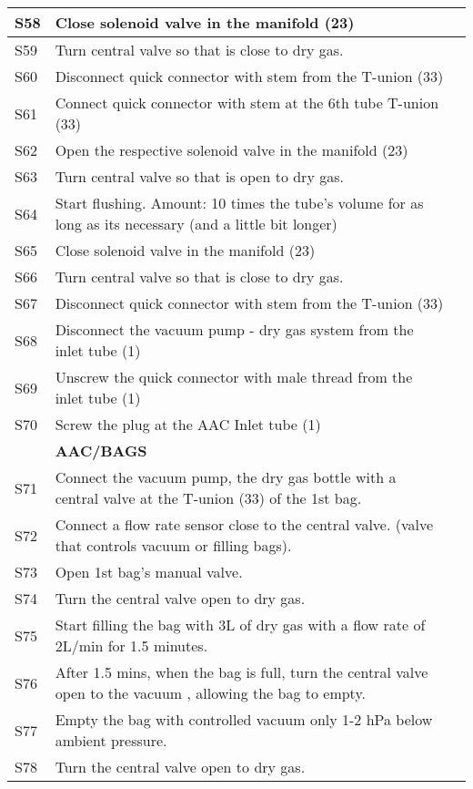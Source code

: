 \begin{longtable} {|m{}|m{}|m{}|}
S58 & Close solenoid valve in the manifold (23) & \\ \hline
S59 & Turn central valve so that is close to dry gas. & \\ \hline
S60 & Disconnect quick connector with stem from the T-union (33) & \\ \hline
S61 & Connect quick connector with stem at the 6th tube T-union (33) & \\ \hline
S62 & Open the respective solenoid valve in the manifold (23) & \\ \hline
S63 & Turn central valve so that is open to dry gas. & \\ \hline
S64 & Start flushing. Amount: 10 times the tube's volume for as long as its necessary (and a little bit longer) & \\ \hline
S65 & Close solenoid valve in the manifold (23) & \\ \hline
S66 & Turn central valve so that is close to dry gas. & \\ \hline
S67 & Disconnect quick connector with stem from the T-union (33) & \\ \hline
S68 & Disconnect the vacuum pump - dry gas system from the inlet tube (1) & \\ \hline
S69 & Unscrew the quick connector with male thread from the inlet tube (1) & \\ \hline
S70 & Screw the plug at the AAC Inlet tube (1) & \\ \hline
&  \textbf{AAC/BAGS} & \\ \hline
S71 & Connect the vacuum pump, the dry gas bottle with a central valve at the T-union (33) of the 1st bag. & \\ \hline
S72 & Connect a flow rate sensor close to the central valve. (valve that controls vacuum or filling bags). & \\ \hline
S73 & Open 1st bag's manual valve. & \\ \hline
S74 & Turn the central valve open to dry gas. & \\ \hline
S75 & Start filling the bag with 3L of dry gas with a flow rate of 2L/min for 1.5 minutes. & \\ \hline
S76 & After 1.5 mins, when the bag is full, turn the central valve open to the vacuum , allowing the bag to empty. & \\ \hline
S77 & Empty the bag with controlled vacuum only 1-2 hPa below ambient pressure. & \\ \hline
S78 & Turn the central valve open to dry gas. & \\ \hline

\end{longtable}
